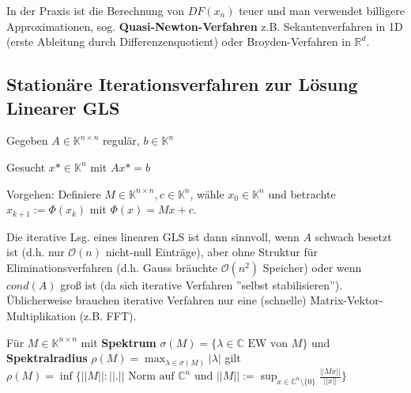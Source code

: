 \begin{remark}
	In der Praxis ist die Berechnung von $DF(x_n)$ teuer und man verwendet billigere Approximationen, sog. \textbf{Quasi-Newton-Verfahren} z.B. Sekantenverfahren in 1D (erste Ableitung durch Differenzenquotient) oder Broyden-Verfahren in $\mathbb{R}^d$.
\end{remark}

\subsection{Stationäre Iterationsverfahren zur Lösung Linearer GLS}

Gegeben $A \in \mathbb{K}^{n \times n}$ regulär, $b \in \mathbb{K}^n$

Gesucht $x* \in \mathbb{K}^n$ mit $Ax* = b$

Vorgehen: Definiere $M \in \mathbb{K}^{n\times n}, c\in \mathbb{K}^n$, wähle $x_0 \in \mathbb{K}^n$ und betrachte $x_{k+1} := \Phi(x_k)$ mit $\Phi(x) = Mx + c$.

\begin{remark}
	Die iterative Lsg. eines linearen GLS ist dann sinnvoll, wenn $A$ schwach besetzt ist (d.h. nur $\mathcal{O}(n)$ nicht-null Einträge), aber ohne Struktur für Eliminationsverfahren (d.h. Gauss bräuchte $\mathcal{O}(n^2)$ Speicher) oder wenn $cond(A)$ groß ist (da sich iterative Verfahren ''selbst stabilisieren''). Üblicherweise brauchen iterative Verfahren nur eine (schnelle) Matrix-Vektor-Multiplikation (z.B. FFT).
\end{remark}

\begin{lemma}
	Für $M \in \mathbb{K}^{n \times n}$ mit \textbf{Spektrum} $\sigma(M) = \{\lambda \in \mathbb{C} \text{ EW von } M\}$ und \textbf{Spektralradius} $\rho(M) = \max_{\lambda \in \sigma(M)}|\lambda|$ gilt $\rho(M) = \inf\{||M|| : ||.|| \text{ Norm auf } \mathbb{C}^n \text{ und } ||M|| := \sup_{x \in \mathbb{C}^n \setminus \{0\}} \frac{||Mx||}{||x||}\}$
\end{lemma}

